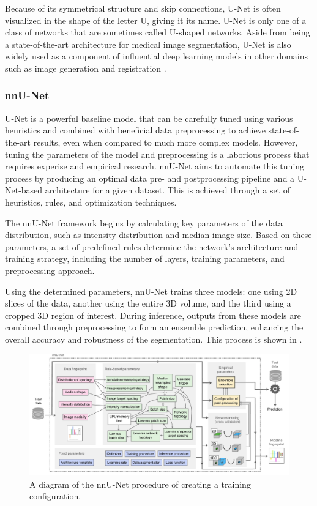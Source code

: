 Because of its symmetrical structure and skip connections, U-Net is often visualized in the shape of the letter U, giving it its name. U-Net is only one of a class of networks that are sometimes called U-shaped networks. Aside from being a state-of-the-art architecture for medical image segmentation, U-Net is also widely used as a component of influential deep learning models in other domains such as image generation \cite{rombach2021highresolution} and registration \cite{sinclairAtlasISTNJointSegmentation2022a}.

\subsubsection{nnU-Net}

U-Net is a powerful baseline model that can be carefully tuned using various heuristics and combined with beneficial data preprocessing to achieve state-of-the-art results, even when compared to much more complex models. However, tuning the parameters of the model and preprocessing is a laborious process that requires experise and empirical research. nnU-Net \cite{isenseeNnUNetSelfconfiguringMethod2021} aims to automate this tuning process by producing an optimal data pre- and postprocessing pipeline and a U-Net-based architecture for a given dataset. This is achieved through a set of heuristics, rules, and optimization techniques.

The nnU-Net framework begins by calculating key parameters of the data distribution, such as intensity distribution and median image size. Based on these parameters, a set of predefined rules determine the network's architecture and training strategy, including the number of layers, training parameters, and preprocessing approach.

Using the determined parameters, nnU-Net trains three models: one using 2D slices of the data, another using the entire 3D volume, and the third using a cropped 3D region of interest. During inference, outputs from these models are combined through preprocessing to form an ensemble prediction, enhancing the overall accuracy and robustness of the segmentation. This process is shown in .

\begin{figure}[t!]
 \centering
 \includegraphics[width=\linewidth]{images/nnunet-arch}
 \caption{A diagram of the nnU-Net procedure of creating a training configuration. \cite{isenseeNnUNetSelfconfiguringMethod2021}}
 \label{fig:nnunet-arch}
 \end{figure}
 
